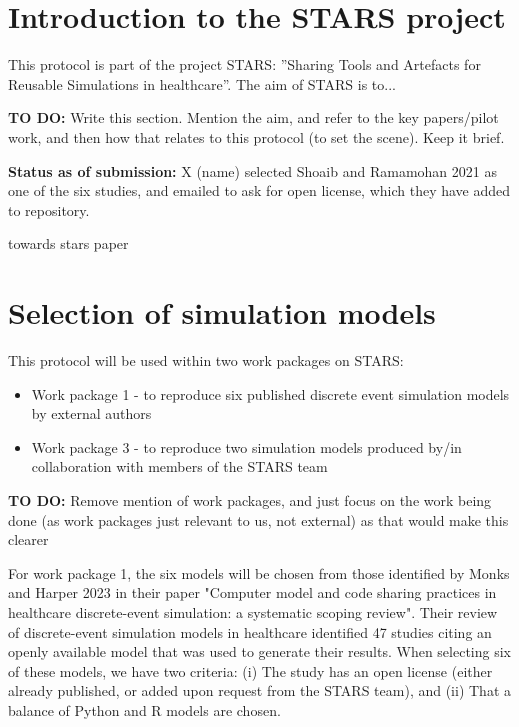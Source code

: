 \section{Introduction to the STARS project}

This protocol is part of the project STARS: ”Sharing Tools and Artefacts for Reusable Simulations in healthcare”. The aim of STARS is to...

\textbf{TO DO:} Write this section. Mention the aim, and refer to the key papers/pilot work, and then how that relates to this protocol (to set the scene). Keep it brief.

\textbf{Status as of submission:} X (name) selected Shoaib and Ramamohan 2021\autocite{shoaib_simulation_2022} as one of the six studies, and emailed to ask for open license, which they have added to repository.

towards stars paper\autocite{monks_towards_2024}

\section{Selection of simulation models}

This protocol will be used within two work packages on STARS:
\begin{itemize}
    \item Work package 1 - to reproduce six published discrete event simulation models by external authors
    \item Work package 3 - to reproduce two simulation models produced by/in collaboration with members of the STARS team
\end{itemize}

\textbf{TO DO:} Remove mention of work packages, and just focus on the work being done (as work packages just relevant to us, not external) as that would make this clearer

For work package 1, the six models will be chosen from those identified by Monks and Harper 2023\autocite{monks_computer_2023} in their paper "Computer model and code sharing practices in healthcare discrete-event simulation: a systematic scoping review". Their review of discrete-event simulation models in healthcare identified 47 studies citing an openly available model that was used to generate their results. When selecting six of these models, we have two criteria: (i) The study has an open license (either already published, or added upon request from the STARS team), and (ii) That a balance of Python and R models are chosen.

